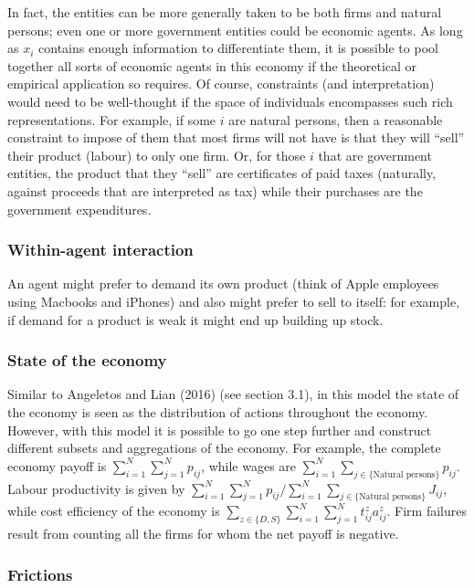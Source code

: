\documentclass[
]{article}
\theoremstyle{definition}
\theoremstyle{plain}
\theoremstyle{remark}
\begin{document}
In fact, the entities can be more generally taken to be both firms and
natural persons; even one or more government entities could be economic
agents. As long as \(x_i\) contains enough information to differentiate
them, it is possible to pool together all sorts of economic agents in
this economy if the theoretical or empirical application so requires. Of
course, constraints (and interpretation) would need to be well-thought
if the space of individuals encompasses such rich representations. For
example, if some \(i\) are natural persons, then a reasonable constraint
to impose of them that most firms will not have is that they will
``sell'' their product (labour) to only one firm. Or, for those \(i\)
that are government entities, the product that they ``sell'' are
certificates of paid taxes (naturally, against proceeds that are
interpreted as tax) while their purchases are the government
expenditures.

\subsubsection{Within-agent interaction}\label{within-agent-interaction}

An agent might prefer to demand its own product (think of Apple
employees using Macbooks and iPhones) and also might prefer to sell to
itself: for example, if demand for a product is weak it might end up
building up stock.

\subsubsection{State of the economy}\label{state-of-the-economy}

Similar to Angeletos and Lian (2016) (see section 3.1), in this model
the state of the economy is seen as the distribution of actions
throughout the economy. However, with this model it is possible to go
one step further and construct different subsets and aggregations of the
economy. For example, the complete economy payoff is
\(\sum_{i=1}^N \sum_{j=1}^N p_{ij}\), while wages are
\(\sum_{i=1}^N \sum_{j \in \{\text{Natural persons}\}} p_{ij}\). Labour
productivity is given by
\(\sum_{i=1}^N \sum_{j=1}^N p_{ij} / \sum_{i=1}^N \sum_{j \in \{\text{Natural persons}\}} J_{ij}\),
while cost efficiency of the economy is
\(\sum_{z \in \{D, S\}}\sum_{i=1}^N \sum_{j=1}^N t_{ij}^z a_{ij}^z\).
Firm failures result from counting all the firms for whom the net payoff
is negative.

\subsubsection{Frictions}\label{frictions}
\end{document}
